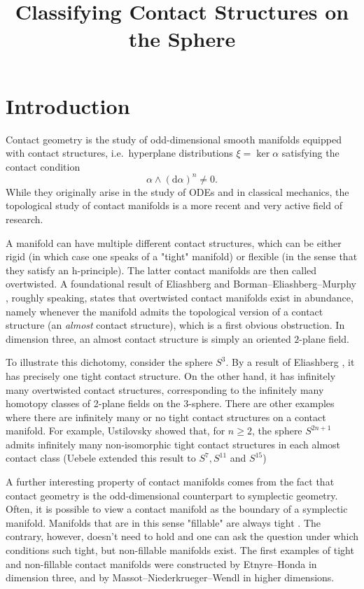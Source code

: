 \documentclass{amsart}
\renewcommand*{\d}{\mathrm{d}}
\begin{document}
\title{Classifying Contact Structures on the Sphere}
\address{}
\date{}

\maketitle
\section*{Introduction}
Contact geometry is the study of odd-dimensional smooth manifolds equipped with contact structures, i.e.\ hyperplane distributions $\xi = \ker \alpha$ satisfying the contact condition
\[
    \alpha \wedge (\d \alpha)^n \neq 0.
\]
While they originally arise in the study of ODEs and in classical mechanics, the topological study of contact manifolds is a more recent and very active field of research.

A manifold can have multiple different contact structures, which can be either rigid (in which case one speaks of a "tight" manifold) or flexible (in the sense that they satisfy an h-principle). The latter contact manifolds are then called overtwisted. A foundational result of Eliashberg \cite{Eliashberg89} and Borman--Eliashberg--Murphy \cite{BEM15}, roughly speaking, states that overtwisted contact manifolds exist in abundance, namely whenever the manifold admits the topological version of a contact structure (an \emph{almost} contact structure), which is a first obvious obstruction. In dimension three, an almost contact structure is simply an oriented $2$-plane field.

To illustrate this dichotomy, consider the sphere $S^3$. By a result of Eliashberg \cite{Eliashberg92}, it has precisely one tight contact structure. On the other hand, it has infinitely many overtwisted contact structures, corresponding to the infinitely many homotopy classes of 2-plane fields on the 3-sphere. There are other examples where there are infinitely many or no tight contact structures on a contact manifold.
For example, Ustilovsky \cite{Ustilovsky99} showed that, for $n \geq 2$, the sphere 
$S^{2n+1}$ admits infinitely many non-isomorphic tight contact structures in each almost 
contact class (Uebele \cite{Uebele16} extended this result to $S^7, S^{11}$ and $S^{15}$)

A further interesting property of contact manifolds comes from the fact that contact geometry is the odd-dimensional counterpart to symplectic geometry. Often, it is possible to view a contact manifold as the boundary of a symplectic manifold. Manifolds that are in this sense "fillable" are always tight \cite{Gromov85,Eliashberg91}.
The contrary, however, doesn't need to hold and one can ask the question under which conditions such tight, but non-fillable manifolds exist. The first examples of tight and non-fillable contact manifolds were constructed by Etnyre--Honda \cite{EH02} in dimension three, and by Massot--Niederkrueger--Wendl \cite{MNW13} in higher dimensions.
\end{document}
